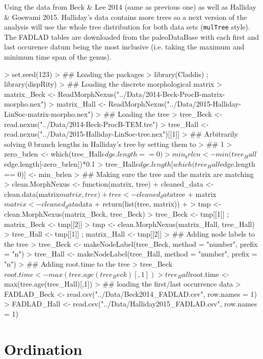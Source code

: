 \documentclass{article}
\begin{document}
Using the data from Beck & Lee 2014 (same as previous one) as well as Halliday & Goswami 2015.
Halliday's data contains more trees so a next version of the analysis will use the whole tree distribution for both data sets (\texttt{mulTree} style).
The FADLAD tables are downloaded from the paleoDataBase with each first and last occurence datum being the most inclusive (i.e. taking the maximum and minimum time span of the genus).

\begin{Schunk}
\begin{Sinput}
> set.seed(123)
> ## Loading the packages
> library(Claddis) ; library(dispRity)
> ## Loading the discrete morphological matrix
> matrix_Beck <- ReadMorphNexus("../Data/2014-Beck-ProcB-matrix-morpho.nex")
> matrix_Hall <- ReadMorphNexus("../Data/2015-Halliday-LinSoc-matrix-morpho.nex")
> ## Loading the tree
> tree_Beck <- read.nexus("../Data/2014-Beck-ProcB-TEM.tre")
> tree_Hall <- read.nexus("../Data/2015-Halliday-LinSoc-tree.nex")[[1]]
> ## Arbitrarily solving 0 branch lengths in Halliday's tree by setting them to
> ## 1% of the minimum branch length
> zero_brlen <- which(tree_Hall$edge.length == 0)
> min_brlen <- min(tree_Hall$edge.length[-zero_brlen])*0.1
> tree_Hall$edge.length[which(tree_Hall$edge.length == 0)] <- min_brlen
> ## Making sure the tree and the matrix are matching
> clean.MorphNexus <- function(matrix, tree) {
+     cleaned_data <- clean.data(matrix$matrix, tree)
+     tree <- cleaned_data$tree
+     matrix$matrix <- cleaned_data$data
+     return(list(tree, matrix))
+ }
> tmp <- clean.MorphNexus(matrix_Beck, tree_Beck)
> tree_Beck <- tmp[[1]] ; matrix_Beck <- tmp[[2]]
> tmp <- clean.MorphNexus(matrix_Hall, tree_Hall)
> tree_Hall <- tmp[[1]] ; matrix_Hall <- tmp[[2]]
> ## Adding node labels to the tree
> tree_Beck <- makeNodeLabel(tree_Beck, method = "number", prefix = "n")
> tree_Hall <- makeNodeLabel(tree_Hall, method = "number", prefix = "n")
> ## Adding root.time to the tree
> tree_Beck$root.time <- max(tree.age(tree_Beck)[,1])
> tree_Hall$root.time <- max(tree.age(tree_Hall)[,1])
> ## loading the first/last occurrence data
> FADLAD_Beck <- read.csv("../Data/Beck2014_FADLAD.csv", row.names = 1)
> FADLAD_Hall <- read.csv("../Data/Halliday2015_FADLAD.csv", row.names = 1)
\end{Sinput}
\end{Schunk}


\section{Ordination}
\end{document}
